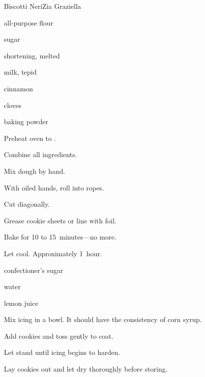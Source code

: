 \begin{recipe}{Biscotti Neri}{Zia Graziella}{}

\begin{ingredients}
\item {} all-purpose flour
\item {} sugar
\item \lbs{\half} shortening, melted
\item {} milk, tepid 
\item {} 
\item {} cinnamon
\item {} cloves
\item {} baking powder
\end{ingredients}

\begin{directions}
\item Preheat oven to .
\item Combine all ingredients.
\item Mix dough by hand.
\item With oiled hands, roll into ropes.
\item Cut diagonally.
\item Grease cookie sheets or line with foil.
\item Bake for 10 to 15~minutes---no more.
\item Let cool. Approximately 1~hour.
\end{directions}


\begin{ingredients}
\item confectioner's sugar
\item water
\item lemon juice
\end{ingredients}

\begin{directions}
\item Mix icing in a bowl. It should have the consistency of corn syrup.
\item Add cookies and toss gently to coat.
\item Let stand until icing begins to harden.
\item Lay cookies out and let dry thoroughly before storing.
\end{directions}

\end{recipe}
